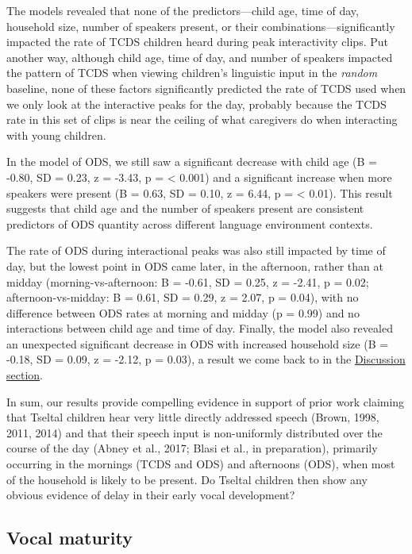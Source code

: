 \documentclass[,man,floatsintext]{apa6}
\begin{document}
The models revealed that none of the predictors---child age, time of
day, household size, number of speakers present, or their
combinations---significantly impacted the rate of TCDS children heard
during peak interactivity clips. Put another way, although child age,
time of day, and number of speakers impacted the pattern of TCDS when
viewing children's linguistic input in the \emph{random} baseline, none
of these factors significantly predicted the rate of TCDS used when we
only look at the interactive peaks for the day, probably because the
TCDS rate in this set of clips is near the ceiling of what caregivers do
when interacting with young children.

In the model of ODS, we still saw a significant decrease with child age
(B = -0.80, SD = 0.23, z = -3.43, p = \textless{} 0.001) and a
significant increase when more speakers were present (B = 0.63, SD =
0.10, z = 6.44, p = \textless{} 0.01). This result suggests that child
age and the number of speakers present are consistent predictors of ODS
quantity across different language environment contexts.

The rate of ODS during interactional peaks was also still impacted by
time of day, but the lowest point in ODS came later, in the afternoon,
rather than at midday (morning-vs-afternoon: B = -0.61, SD = 0.25, z =
-2.41, p = 0.02; afternoon-vs-midday: B = 0.61, SD = 0.29, z = 2.07, p =
0.04), with no difference between ODS rates at morning and midday (p =
0.99) and no interactions between child age and time of day. Finally,
the model also revealed an unexpected significant decrease in ODS with
increased household size (B = -0.18, SD = 0.09, z = -2.12, p = 0.03), a
result we come back to in the \protect\hyperlink{disc}{Discussion
section}.

In sum, our results provide compelling evidence in support of prior work
claiming that Tseltal children hear very little directly addressed
speech (Brown, 1998, 2011, 2014) and that their speech input is
non-uniformly distributed over the course of the day (Abney et al.,
2017; Blasi et al., in preparation), primarily occurring in the mornings
(TCDS and ODS) and afternoons (ODS), when most of the household is
likely to be present. Do Tseltal children then show any obvious evidence
of delay in their early vocal development?

\subsection{Vocal maturity}\label{vocal-maturity}
\end{document}
